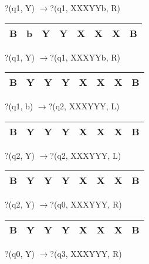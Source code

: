?(q1, Y) $\to $?(q1, XXXYYb, R)

\noindent 

\begin{tabular}{|p{0.2in}|p{0.2in}|p{0.2in}|p{0.2in}|p{0.2in}|p{0.2in}|p{0.2in}|p{0.2in}|} \hline 
B & b & Y & Y & X & X & X & B \\ \hline 
\end{tabular}

?(q1, Y) $\to $?(q1, XXXYYb, R)

\noindent 

\begin{tabular}{|p{0.2in}|p{0.2in}|p{0.2in}|p{0.2in}|p{0.2in}|p{0.2in}|p{0.2in}|p{0.2in}|} \hline 
B & Y & Y & Y & X & X & X & B \\ \hline 
\end{tabular}

?(q1, b) $\to $?(q2, XXXYYY, L)

\noindent 

\begin{tabular}{|p{0.2in}|p{0.2in}|p{0.2in}|p{0.2in}|p{0.2in}|p{0.2in}|p{0.2in}|p{0.2in}|} \hline 
B & Y & Y & Y & X & X & X & B \\ \hline 
\end{tabular}

?(q2, Y) $\to $?(q2, XXXYYY, L)

\noindent 

\begin{tabular}{|p{0.2in}|p{0.2in}|p{0.2in}|p{0.2in}|p{0.2in}|p{0.2in}|p{0.2in}|p{0.2in}|} \hline 
B & Y & Y & Y & X & X & X & B \\ \hline 
\end{tabular}

?(q2, Y) $\to $?(q0, XXXYYY, R)

\noindent 

\begin{tabular}{|p{0.2in}|p{0.2in}|p{0.2in}|p{0.2in}|p{0.2in}|p{0.2in}|p{0.2in}|p{0.2in}|} \hline 
B & Y & Y & Y & X & X & X & B \\ \hline 
\end{tabular}

?(q0, Y) $\to $?(q3, XXXYYY, R)

\noindent 

\noindent 

\noindent 

\noindent 

\noindent 

\noindent 

\noindent 

